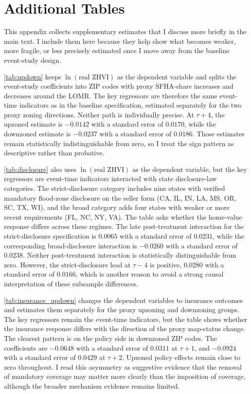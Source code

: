 \documentclass[12pt]{article}
\begin{document}
\section{Additional Tables}\label{app:tables}

This appendix collects supplementary estimates that I discuss more briefly in the main text. I include them here because they help show what becomes weaker, more fragile, or less precisely estimated once I move away from the baseline event-study design.

\autoref{tab:updown} keeps $\ln(\text{real ZHVI})$ as the dependent variable and splits the event-study coefficients into ZIP codes with proxy SFHA-share increases and decreases around the LOMR. The key regressors are therefore the same event-time indicators as in the baseline specification, estimated separately for the two proxy zoning directions. Neither path is individually precise. At $\tau{+}4$, the upzoned estimate is $-0.0142$ with a standard error of $0.0170$, while the downzoned estimate is $-0.0237$ with a standard error of $0.0186$. Those estimates remain statistically indistinguishable from zero, so I treat the sign pattern as descriptive rather than probative.



\autoref{tab:disclosure} also uses $\ln(\text{real ZHVI})$ as the dependent variable, but the key regressors are event-time indicators interacted with state disclosure-law categories. The strict-disclosure category includes nine states with verified mandatory flood-zone disclosure on the seller form (CA, IL, IN, LA, MS, OR, SC, TX, WI), and the broad category adds four states with weaker or more recent requirements (FL, NC, NY, VA). The table asks whether the home-value response differs across these regimes. The late post-treatment interaction for the strict-disclosure specification is $0.0065$ with a standard error of $0.0231$, while the corresponding broad-disclosure interaction is $-0.0260$ with a standard error of $0.0238$. Neither post-treatment interaction is statistically distinguishable from zero. However, the strict-disclosure lead at $\tau{-}4$ is positive, $0.0280$ with a standard error of $0.0166$, which is another reason to avoid a strong causal interpretation of these subsample differences.



\autoref{tab:insurance_updown} changes the dependent variables to insurance outcomes and estimates them separately for the proxy upzoning and downzoning groups. The key regressors remain the event-time indicators, but the table shows whether the insurance response differs with the direction of the proxy map-status change. The clearest pattern is on the policy side in downzoned ZIP codes. The coefficients are $-0.0648$ with a standard error of $0.0311$ at $\tau{+}1$, and $-0.0924$ with a standard error of $0.0429$ at $\tau{+}2$. Upzoned policy effects remain close to zero throughout. I read this asymmetry as suggestive evidence that the removal of mandatory coverage may matter more clearly than the imposition of coverage, although the broader mechanism evidence remains limited.
\end{document}
